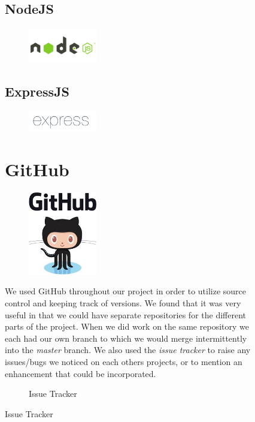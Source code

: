 \begin{figure}
\subsection{NodeJS}
\begin{figure}
\includegraphics[width=3cm]{img/mobile-app/logos/nodejs.png}
\end{figure} 

\subsection{ExpressJS}
\begin{figure}
\includegraphics[width=3cm]{img/mobile-app/logos/express.png}
\end{figure} 

  \pagebreak
  \section{GitHub}
  \begin{figure}
  	\includegraphics[width=3cm]{img/zf2/github-logo.png}
  \end{figure} 
  We used GitHub \cite{github} throughout our project in order to utilize source control and keeping track of versions.
  We found that it was very useful in that we could have separate repositories for the different parts of the project.
  When we did work on the same repository we each had our own branch to which we would merge intermittently into the \textit{master} branch.
  We also used the \textit{issue tracker} to raise any issues/bugs we noticed on each others projects, or to mention an enhancement that could be incorporated.
  
  \begin{figure}[H] 
  	\caption{Issue Tracker}
  	\label{fig:speciation}
  \end{figure}
  

\end{figure}
